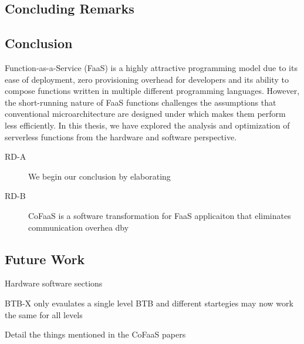 \documentclass[../main.tex]{subfiles}
\begin{document}
\ifx\chapincluded\undefined
  \begin{refsection}
 \fi

\chapter{Concluding Remarks}
\label{chap:conclusions}
\section{Conclusion}
Function-as-a-Service (FaaS) is a highly attractive programming model
due to its ease of deployment, zero provisioning overhead for
developers and its ability to compose functions written in multiple
different programming languages. However, the short-running nature of
FaaS functions challenges the assumptions that conventional
microarchitecture are designed under which makes them perform less
efficiently. In this thesis, we have explored the analysis and
optimization of serverless functions from the hardware and software
perspective.

\begin{description}

\item[RD-A] We begin our conclusion by elaborating 

\item[RD-B] CoFaaS is a software transformation for FaaS applicaiton that eliminates communication overhea dby 

\end{description}

\section{Future Work}


Hardware software sections

BTB-X only evaulates a single level BTB and different startegies may now work the same for all levels
 
Detail the things mentioned in the CoFaaS papers


\ifx\chapincluded\undefined
  \printbibliography
  \end{refsection}
 \fi
\end{document}

